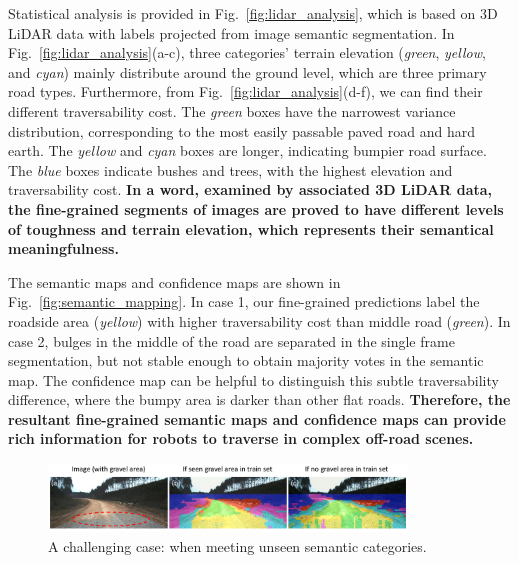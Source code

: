 \documentclass[letterpaper, 10 pt, conference]{ieeeconf}  %
\begin{document}
	Statistical analysis is provided in Fig.~\ref{fig:lidar_analysis}, which is based on 3D LiDAR data with labels projected from image semantic segmentation.
	In Fig.~\ref{fig:lidar_analysis}(a-c), three categories' terrain elevation (\textit{green}, \textit{yellow}, and \textit{cyan}) mainly distribute around the ground level, which are three primary road types. Furthermore, from Fig.~\ref{fig:lidar_analysis}(d-f), we can find their different traversability cost. The \textit{green} boxes have the narrowest variance distribution, corresponding to the most easily passable paved road and hard earth. The \textit{yellow} and \textit{cyan} boxes are longer, indicating bumpier road surface. The \textit{blue} boxes indicate bushes and trees, with the highest elevation and traversability cost.
	\textbf{In a word, examined by associated 3D LiDAR data, the fine-grained segments of images are proved to have different levels of toughness and terrain elevation, which represents their semantical meaningfulness.}
	
	The semantic maps and confidence maps are shown in Fig.~\ref{fig:semantic_mapping}. In case 1, our fine-grained predictions label the roadside area (\textit{yellow}) with higher traversability cost than middle road (\textit{green}). In case 2, bulges in the middle of the road are separated in the single frame segmentation, but not stable enough to obtain majority votes in the semantic map. The confidence map can be helpful to distinguish this subtle traversability difference, where the bumpy area is darker than other flat roads. \textbf{Therefore, the resultant fine-grained semantic maps and confidence maps can provide rich information for robots to traverse in complex off-road scenes.}
	
	\begin{figure}[]
		\centering
		\includegraphics[width=0.85\textwidth]{challenges.pdf}
		\caption{A challenging case: when meeting unseen semantic categories.}
		\label{fig:challenges}
		\vspace{-4mm}
	\end{figure}
	
\end{document}
